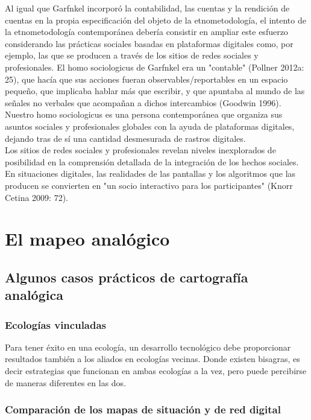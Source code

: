 Al igual que Garfnkel incorporó la contabilidad, las cuentas y la rendición de cuentas en la propia especificación del objeto de la etnometodología, el intento de la etnometodología contemporánea debería consistir en ampliar este esfuerzo considerando las prácticas sociales basadas en plataformas digitales como, por ejemplo, las que se producen a través de los sitios de redes sociales y profesionales. El homo sociologicus de Garfnkel era un "contable" (Pollner 2012a: 25), que hacía que sus acciones fueran observables/reportables en un espacio pequeño, que implicaba hablar más que escribir, y que apuntaba al mundo de las señales no verbales que acompañan a dichos intercambios (Goodwin 1996). Nuestro homo sociologicus es una persona contemporánea que organiza sus asuntos sociales y profesionales globales con la ayuda de plataformas digitales, dejando tras de sí una cantidad desmesurada de rastros digitales.\\

Los sitios de redes sociales y profesionales revelan niveles inexplorados de posibilidad en la comprensión detallada de la integración de los hechos sociales. En situaciones digitales, las realidades de las pantallas y los algoritmos que las producen se convierten en "un socio interactivo para los participantes" (Knorr Cetina 2009: 72). 

\section{El mapeo analógico}

\subsection{Algunos casos prácticos de cartografía analógica}

\subsubsection{Ecologías vinculadas}
Para tener éxito en una ecología, un desarrollo tecnológico debe proporcionar resultados también a los aliados en ecologías vecinas. Donde existen bisagras, es decir estrategias que funcionan en ambas ecologías a la vez, pero puede percibirse de maneras diferentes en las dos. 

\subsubsection{Comparación de los mapas de situación y de red digital}
